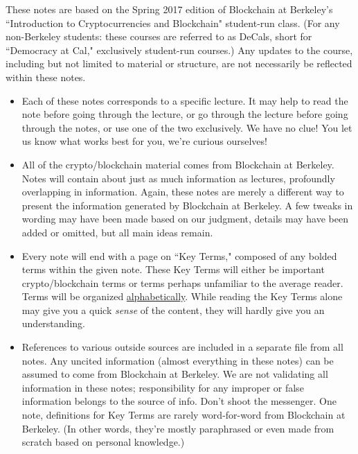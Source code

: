 \documentclass[full.tex]{subfiles}
\begin{document}
    These notes are based on the Spring 2017 edition of Blockchain at Berkeley's ``Introduction to Cryptocurrencies and Blockchain" student-run class. (For any non-Berkeley students: these courses are referred to as DeCals, short for ``Democracy at Cal," exclusively student-run courses.) Any updates to the course, including but not limited to material or structure, are not necessarily be reflected within these notes.
    \begin{itemize}
        \item Each of these notes corresponds to a specific lecture. It may help to read the note before going through the lecture, or go through the lecture before going through the notes, or use one of the two exclusively. We have no clue! You let us know what works best for you, we're curious ourselves!
        \item All of the crypto/blockchain material comes from Blockchain at Berkeley. Notes will contain about just as much information as lectures, profoundly overlapping in information. Again, these notes are merely a different way to present the information generated by Blockchain at Berkeley. A few tweaks in wording may have been made based on our judgment, details may have been added or omitted, but all main ideas remain.
        \item Every note will end with a page on ``Key Terms," composed of any bolded terms within the given note. These Key Terms will either be important crypto/blockchain terms or terms perhaps unfamiliar to the average reader. Terms will be organized \underline{alphabetically}. While reading the Key Terms alone may give you a quick \textit{sense} of the content, they will hardly give you an understanding.
        \item References to various outside sources are included in a separate file from all notes. Any uncited information (almost everything in these notes) can be assumed to come from Blockchain at Berkeley. We are not validating all information in these notes; responsibility for any improper or false information belongs to the source of info. Don't shoot the messenger. One note, definitions for Key Terms are rarely word-for-word from Blockchain at Berkeley. (In other words, they're mostly paraphrased or even made from scratch based on personal knowledge.)
    \end{itemize}
    
    \newpage
    \thispagestyle{firstpage}
    \vspace*{2\baselineskip}
\end{document}
